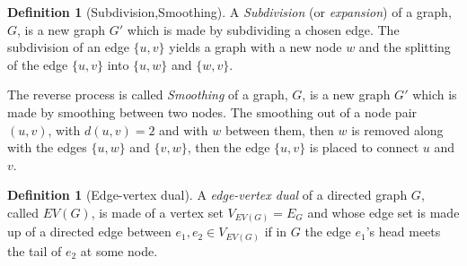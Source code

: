 \documentclass[a4paper,10pt]{article}
\theoremstyle{definition}
\newtheorem{definition}[theorem]{Definition}
\theoremstyle{definition}
\theoremstyle{remark}
\theoremstyle{definition}
\begin{document}
\begin{definition}[Subdivision,Smoothing]
A \textit{Subdivision} (or \textit{expansion}) of a graph, $G$, is a new graph $G'$ which is made by subdividing a chosen edge. The subdivision of an edge $\{u,v\}$ yields a graph with a new node $w$ and the splitting of the edge $\{u,v\}$ into $\{u,w\}$ and $\{w,v\}$.

The reverse process is called \textit{Smoothing} of a graph, $G$, is a new graph $G'$ which is made by smoothing between two nodes. The smoothing out of a node pair $(u,v)$, with $d(u,v)=2$ and with $w$ between them, then $w$ is removed along with the edges $\{u,w\}$ and $\{v,w\}$, then the edge $\{u,v\}$ is placed to connect $u$ and $v$. 
\end{definition}

\begin{myfigure}
\begin{center}
\caption{Subdivision and Smoothing of the edge $\{1,2\}$}
\end{center}
\end{myfigure}

\begin{definition}[Edge-vertex dual]
A \textit{edge-vertex dual} of a directed graph $G$, called $EV(G)$, is made of a vertex set $V_{EV(G)}=E_{G}$ and whose edge set is made up of a directed edge between $e_{1},e_{2} \in V_{EV(G)}$ if in $G$ the edge $e_{1}$'s head meets the tail of $e_{2}$ at some node.
\end{definition}
\end{document}

